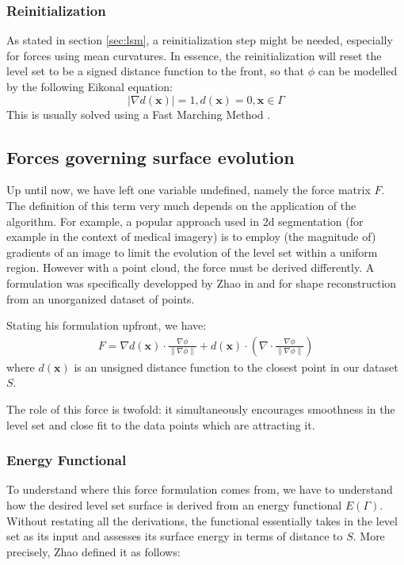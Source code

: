 \documentclass{article}
\begin{document}
\subsubsection{Reinitialization}
As stated in section \ref{sec:lsm}, a reinitialization step might be needed,
especially for forces using mean curvatures. In essence, the reinitialization
will reset the level set to be a signed distance function to the front, so that
$\phi$ can be modelled by the following Eikonal equation:
\[
| \nabla d(\mathbf{x}) | = 1, d(\mathbf{x}) = 0, \mathbf{x} \in \Gamma
\]
This is usually solved using a Fast Marching Method \cite{sethian1999advancing}.

\subsection{Forces governing surface evolution}

Up until now, we have left one variable undefined, namely the force matrix $F$.
The definition of this term very much depends on the application of the
algorithm. For example, a popular approach used in 2d segmentation (for example
in the context of medical imagery) is to employ (the magnitude of) gradients
of an image to limit the evolution of the level set within a uniform region.
However with a point cloud, the force must be derived differently. A formulation
was specifically developped by Zhao in \cite{zhao2000implicit} and
\cite{zhao2001fast} for shape reconstruction from an unorganized dataset of
points. 

Stating his formulation upfront, we have:
\begin{align}
    \label{eq:force}
    F = \nabla d(\mathbf{x}) \cdot \frac{\nabla \phi}{\| \nabla \phi \|}
+ d(\mathbf{x}) \cdot (\nabla \cdot \frac{\nabla \phi}{\| \nabla \phi \|} )
\end{align}
where $d(\mathbf{x})$ is an unsigned distance function to the closest point in
our dataset $S$.

The role of this force is twofold: it simultaneously encourages smoothness in
the level set and close fit to the data points which are attracting it.

\subsubsection{Energy Functional}
To understand where this force formulation comes from, we have to understand how
the desired level set surface is derived from an energy functional $E(\Gamma)$.
Without restating all the derivations, the functional essentially takes in the
level set as its input and assesses its surface energy in terms of distance to
$S$. More precisely, Zhao\cite{zhao2000implicit} defined it as follows:
\end{document}
